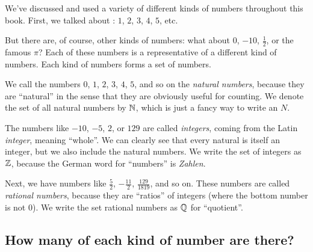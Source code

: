 We've discussed and used a variety of different kinds of numbers throughout this book.
First, we talked about : $1$, $2$, $3$, $4$, $5$, etc.

But there are, of course, other kinds of numbers: what about $0$, $-10$, $\frac{1}{2}$, or the famous $\pi$?
Each of these numbers is a representative of a different kind of numbers.
Each kind of numbers forms a set of numbers.

We call the numbers $0$, $1$, $2$, $3$, $4$, $5$, and so on the \emph{natural numbers}, because they are ``natural'' in the sense that they are obviously useful for counting.
We denote the set of all natural numbers by $\mathbb{N}$, which is just a fancy way to write an $N$.

The numbers like $-10$, $-5$, $2$, or $129$ are called \emph{integers}, coming from the Latin \emph{integer}, meaning ``whole''.
We can clearly see that every natural is itself an integer, but we also include the natural numbers.
We write the set of integers as $\mathbb{Z}$, because the German word for ``numbers'' is \emph{Zahlen}.

Next, we have numbers like $\frac{5}{2}$, $-\frac{11}{2}$, $\frac{129}{1819}$, and so on.
These numbers are called \emph{rational numbers}, because they are ``ratios'' of integers (where the bottom number is not $0$).
We write the set rational numbers as $\mathbb{Q}$ for ``quotient''.

\subsection{How many of each kind of number are there?}

